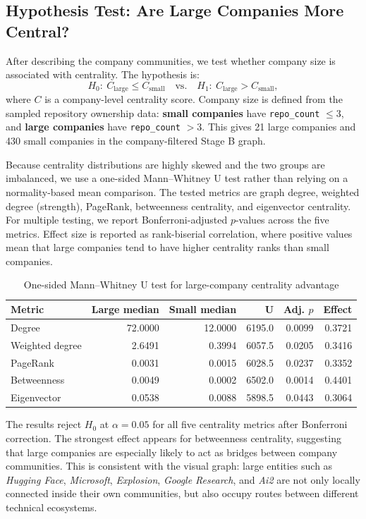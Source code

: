 \documentclass[11pt]{article}
\begin{document}
\subsection{Hypothesis Test: Are Large Companies More Central?}
After describing the company communities, we test whether company size is associated with centrality.
The hypothesis is:
\[
H_0:\ C_{\text{large}}\leq C_{\text{small}}
\quad\text{vs.}\quad
H_1:\ C_{\text{large}}>C_{\text{small}},
\]
where $C$ is a company-level centrality score.
Company size is defined from the sampled repository ownership data:
\textbf{small companies} have \texttt{repo\_count} $\leq 3$, and
\textbf{large companies} have \texttt{repo\_count} $>3$.
This gives 21 large companies and 430 small companies in the company-filtered Stage B graph.

Because centrality distributions are highly skewed and the two groups are imbalanced, we use a one-sided Mann--Whitney U test rather than relying on a normality-based mean comparison.
The tested metrics are graph degree, weighted degree (strength), PageRank, betweenness centrality, and eigenvector centrality.
For multiple testing, we report Bonferroni-adjusted $p$-values across the five metrics.
Effect size is reported as rank-biserial correlation, where positive values mean that large companies tend to have higher centrality ranks than small companies.

\begin{table}[h]
\centering
\caption{One-sided Mann--Whitney U test for large-company centrality advantage}
\begin{tabular}{lrrrrr}
\toprule
Metric & Large median & Small median & U & Adj. $p$ & Effect \\
\midrule
Degree & 72.0000 & 12.0000 & 6195.0 & 0.0099 & 0.3721 \\
Weighted degree & 2.6491 & 0.3994 & 6057.5 & 0.0205 & 0.3416 \\
PageRank & 0.0031 & 0.0015 & 6028.5 & 0.0237 & 0.3352 \\
Betweenness & 0.0049 & 0.0002 & 6502.0 & 0.0014 & 0.4401 \\
Eigenvector & 0.0538 & 0.0088 & 5898.5 & 0.0443 & 0.3064 \\
\bottomrule
\end{tabular}
\label{tab:large-company-centrality-test}
\end{table}

The results reject $H_0$ at $\alpha=0.05$ for all five centrality metrics after Bonferroni correction.
The strongest effect appears for betweenness centrality, suggesting that large companies are especially likely to act as bridges between company communities.
This is consistent with the visual graph: large entities such as \textit{Hugging Face}, \textit{Microsoft}, \textit{Explosion}, \textit{Google Research}, and \textit{Ai2} are not only locally connected inside their own communities, but also occupy routes between different technical ecosystems.
\end{document}
